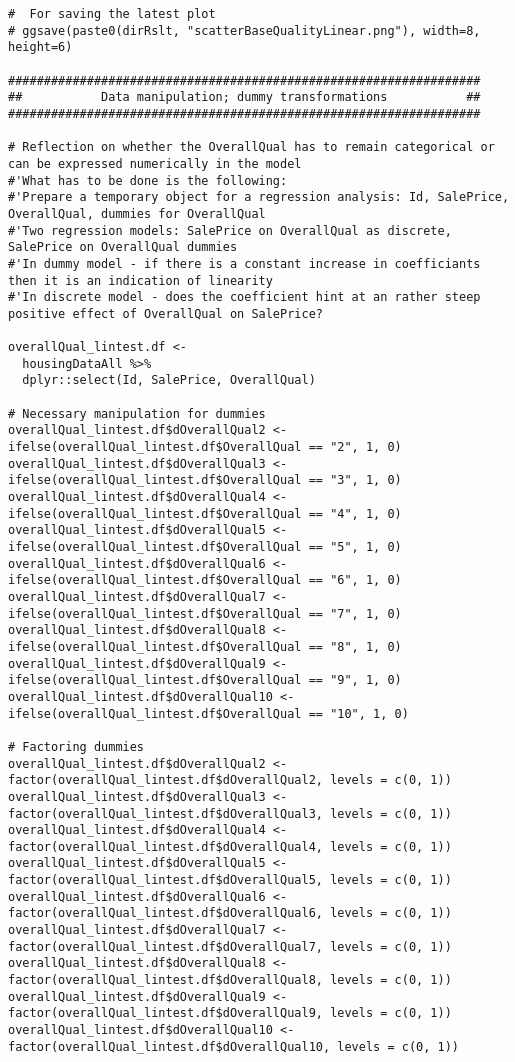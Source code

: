 \documentclass{article}
\begin{document}
\begin{tiny}
\begin{verbatim}
#  For saving the latest plot 
# ggsave(paste0(dirRslt, "scatterBaseQualityLinear.png"), width=8, height=6)

##################################################################
##           Data manipulation; dummy transformations           ##
##################################################################

# Reflection on whether the OverallQual has to remain categorical or can be expressed numerically in the model
#'What has to be done is the following:
#'Prepare a temporary object for a regression analysis: Id, SalePrice, OverallQual, dummies for OverallQual
#'Two regression models: SalePrice on OverallQual as discrete, SalePrice on OverallQual dummies
#'In dummy model - if there is a constant increase in coefficiants then it is an indication of linearity
#'In discrete model - does the coefficient hint at an rather steep positive effect of OverallQual on SalePrice? 

overallQual_lintest.df <-
  housingDataAll %>% 
  dplyr::select(Id, SalePrice, OverallQual)

# Necessary manipulation for dummies
overallQual_lintest.df$dOverallQual2 <- ifelse(overallQual_lintest.df$OverallQual == "2", 1, 0)
overallQual_lintest.df$dOverallQual3 <- ifelse(overallQual_lintest.df$OverallQual == "3", 1, 0)
overallQual_lintest.df$dOverallQual4 <- ifelse(overallQual_lintest.df$OverallQual == "4", 1, 0)
overallQual_lintest.df$dOverallQual5 <- ifelse(overallQual_lintest.df$OverallQual == "5", 1, 0)
overallQual_lintest.df$dOverallQual6 <- ifelse(overallQual_lintest.df$OverallQual == "6", 1, 0)
overallQual_lintest.df$dOverallQual7 <- ifelse(overallQual_lintest.df$OverallQual == "7", 1, 0)
overallQual_lintest.df$dOverallQual8 <- ifelse(overallQual_lintest.df$OverallQual == "8", 1, 0)
overallQual_lintest.df$dOverallQual9 <- ifelse(overallQual_lintest.df$OverallQual == "9", 1, 0)
overallQual_lintest.df$dOverallQual10 <- ifelse(overallQual_lintest.df$OverallQual == "10", 1, 0)

# Factoring dummies
overallQual_lintest.df$dOverallQual2 <- factor(overallQual_lintest.df$dOverallQual2, levels = c(0, 1))
overallQual_lintest.df$dOverallQual3 <- factor(overallQual_lintest.df$dOverallQual3, levels = c(0, 1))
overallQual_lintest.df$dOverallQual4 <- factor(overallQual_lintest.df$dOverallQual4, levels = c(0, 1))
overallQual_lintest.df$dOverallQual5 <- factor(overallQual_lintest.df$dOverallQual5, levels = c(0, 1))
overallQual_lintest.df$dOverallQual6 <- factor(overallQual_lintest.df$dOverallQual6, levels = c(0, 1))
overallQual_lintest.df$dOverallQual7 <- factor(overallQual_lintest.df$dOverallQual7, levels = c(0, 1))
overallQual_lintest.df$dOverallQual8 <- factor(overallQual_lintest.df$dOverallQual8, levels = c(0, 1))
overallQual_lintest.df$dOverallQual9 <- factor(overallQual_lintest.df$dOverallQual9, levels = c(0, 1))
overallQual_lintest.df$dOverallQual10 <- factor(overallQual_lintest.df$dOverallQual10, levels = c(0, 1))


\end{verbatim}
\end{tiny}
\end{document}
